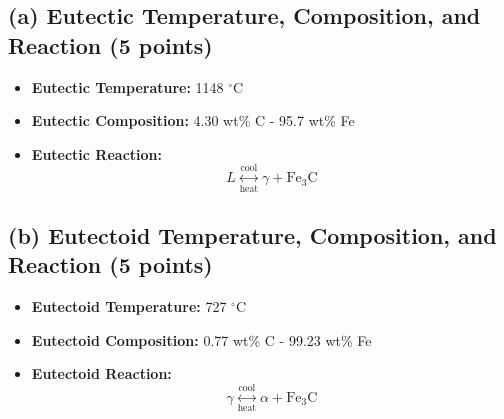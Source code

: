 \documentclass[11pt]{article}
\begin{document}
\subsection*{(a) Eutectic Temperature, Composition, and Reaction (5 points)}
\begin{itemize}
    \item \textbf{Eutectic Temperature:} 1148 \(^\circ\)C
    \item \textbf{Eutectic Composition:} 4.30 wt\% C - 95.7 wt\% Fe
    \item \textbf{Eutectic Reaction:}
    \begin{equation*}
        L \overset{\text{cool}}{\underset{\text{heat}}{\longleftrightarrow}} \gamma + \text{Fe}_3\text{C}
    \end{equation*}
\end{itemize}

\subsection*{(b) Eutectoid Temperature, Composition, and Reaction (5 points)}
\begin{itemize}
    \item \textbf{Eutectoid Temperature:} 727 \(^\circ\)C
    \item \textbf{Eutectoid Composition:} 0.77 wt\% C - 99.23 wt\% Fe
    \item \textbf{Eutectoid Reaction:}
    \begin{equation*}
        \gamma \overset{\text{cool}}{\underset{\text{heat}}{\longleftrightarrow}} \alpha + \text{Fe}_3\text{C}
    \end{equation*}
\end{itemize}
\end{document}
